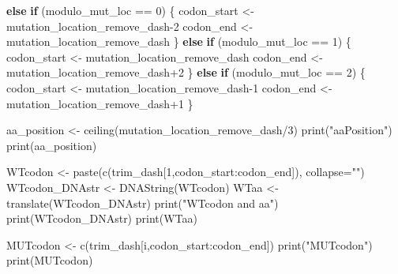 \documentclass[
]{article}
\newenvironment{Shaded}{\begin{snugshade}}{\end{snugshade}}
\newcommand{\AttributeTok}[1]{\textcolor[rgb]{0.77,0.63,0.00}{#1}}
\newcommand{\ControlFlowTok}[1]{\textcolor[rgb]{0.13,0.29,0.53}{\textbf{#1}}}
\newcommand{\DecValTok}[1]{\textcolor[rgb]{0.00,0.00,0.81}{#1}}
\newcommand{\FunctionTok}[1]{\textcolor[rgb]{0.00,0.00,0.00}{#1}}
\newcommand{\NormalTok}[1]{#1}
\newcommand{\OtherTok}[1]{\textcolor[rgb]{0.56,0.35,0.01}{#1}}
\newcommand{\SpecialCharTok}[1]{\textcolor[rgb]{0.00,0.00,0.00}{#1}}
\newcommand{\StringTok}[1]{\textcolor[rgb]{0.31,0.60,0.02}{#1}}
\begin{document}
\begin{Shaded}
\begin{Highlighting}[]
      \ControlFlowTok{else} \ControlFlowTok{if}\NormalTok{ (modulo\_mut\_loc }\SpecialCharTok{==} \DecValTok{0}\NormalTok{)}
\NormalTok{      \{}
\NormalTok{        codon\_start }\OtherTok{\textless{}{-}}\NormalTok{ mutation\_location\_remove\_dash}\DecValTok{{-}2}
\NormalTok{        codon\_end }\OtherTok{\textless{}{-}}\NormalTok{ mutation\_location\_remove\_dash}
\NormalTok{      \}}
      \ControlFlowTok{else} \ControlFlowTok{if}\NormalTok{ (modulo\_mut\_loc }\SpecialCharTok{==} \DecValTok{1}\NormalTok{)}
\NormalTok{      \{}
\NormalTok{        codon\_start }\OtherTok{\textless{}{-}}\NormalTok{ mutation\_location\_remove\_dash}
\NormalTok{        codon\_end }\OtherTok{\textless{}{-}}\NormalTok{ mutation\_location\_remove\_dash}\SpecialCharTok{+}\DecValTok{2}
\NormalTok{      \}}
      \ControlFlowTok{else} \ControlFlowTok{if}\NormalTok{ (modulo\_mut\_loc }\SpecialCharTok{==} \DecValTok{2}\NormalTok{)}
\NormalTok{      \{}
\NormalTok{        codon\_start }\OtherTok{\textless{}{-}}\NormalTok{ mutation\_location\_remove\_dash}\DecValTok{{-}1}
\NormalTok{        codon\_end }\OtherTok{\textless{}{-}}\NormalTok{ mutation\_location\_remove\_dash}\SpecialCharTok{+}\DecValTok{1}
\NormalTok{      \}}
      
\NormalTok{      aa\_position }\OtherTok{\textless{}{-}} \FunctionTok{ceiling}\NormalTok{(mutation\_location\_remove\_dash}\SpecialCharTok{/}\DecValTok{3}\NormalTok{)}
      \FunctionTok{print}\NormalTok{(}\StringTok{"aaPosition"}\NormalTok{)}
      \FunctionTok{print}\NormalTok{(aa\_position)}
      
\NormalTok{      WTcodon }\OtherTok{\textless{}{-}} \FunctionTok{paste}\NormalTok{(}\FunctionTok{c}\NormalTok{(trim\_dash[}\DecValTok{1}\NormalTok{,codon\_start}\SpecialCharTok{:}\NormalTok{codon\_end]), }\AttributeTok{collapse=}\StringTok{""}\NormalTok{)}
\NormalTok{      WTcodon\_DNAstr }\OtherTok{\textless{}{-}} \FunctionTok{DNAString}\NormalTok{(WTcodon)}
\NormalTok{      WTaa }\OtherTok{\textless{}{-}} \FunctionTok{translate}\NormalTok{(WTcodon\_DNAstr)}
      \FunctionTok{print}\NormalTok{(}\StringTok{"WTcodon and aa"}\NormalTok{)}
      \FunctionTok{print}\NormalTok{(WTcodon\_DNAstr)}
      \FunctionTok{print}\NormalTok{(WTaa)}
      
\NormalTok{      MUTcodon }\OtherTok{\textless{}{-}} \FunctionTok{c}\NormalTok{(trim\_dash[i,codon\_start}\SpecialCharTok{:}\NormalTok{codon\_end])}
      \FunctionTok{print}\NormalTok{(}\StringTok{"MUTcodon"}\NormalTok{)}
      \FunctionTok{print}\NormalTok{(MUTcodon)}
      

\end{Highlighting}
\end{Shaded}
\end{document}
